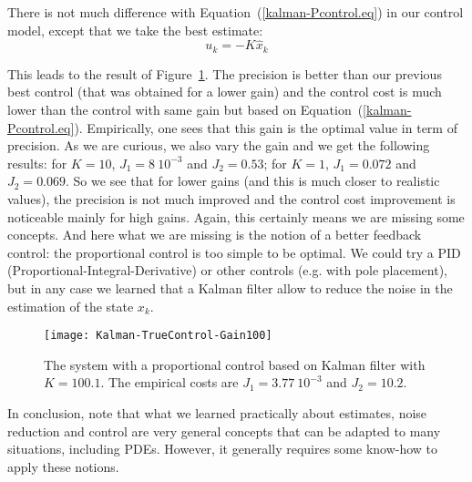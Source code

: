 There is not much difference with Equation~(\ref{kalman-Pcontrol.eq}) in our control model, except that we take the best estimate:
\begin{equation}
\label{kalman-Pcontrol.eq2}
	u_k = -K \hat{x}_k
\end{equation}

This leads to the result of Figure~\ref{Kalman-TrueControl-Gain100.fig}. The precision is better than our previous best control (that was obtained for a lower gain) and the control cost is much lower than the control with same gain but based on Equation~(\ref{kalman-Pcontrol.eq}). Empirically, one sees that this gain is the optimal value in term of precision. As we are curious, we also vary the gain and we get the following results: for $K=10$, $J_1=8\ 10^{-3}$ and  $J_2=0.53$; for $K=1$, $J_1=0.072$ and  $J_2=0.069$. So we see that for lower gains (and this is much closer to realistic values), the precision is not much improved and the control cost improvement is noticeable mainly for high gains. Again, this certainly means we are missing some concepts. And here what we are missing is the notion of a better feedback control: the proportional control is too simple to be optimal. We could try a PID (Proportional-Integral-Derivative) or other controls (e.g. with pole placement), but in any case we learned that a Kalman filter allow to reduce the noise in the estimation of the state $x_k$.


\begin{figure}[htb]
	\centering
	\texttt{[image: Kalman-TrueControl-Gain100]}       
	\caption{The system with a proportional control based on Kalman filter with $K=100.1$. The empirical costs are $J_1=3.77\ 10^{-3}$ and  $J_2=10.2$.}
	\label{Kalman-TrueControl-Gain100.fig}
\end{figure}

In conclusion, note that what we learned practically about estimates, noise reduction and control are very general concepts that can be adapted to many situations, including PDEs. However, it generally requires some know-how to apply these notions.